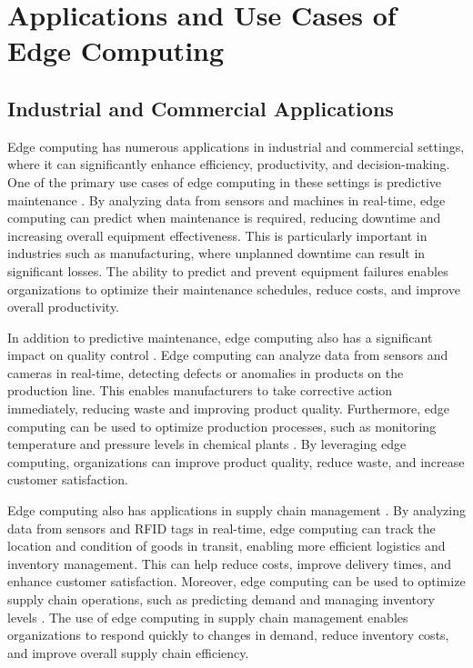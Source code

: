 \documentclass[11pt]{article}
\begin{document}
\section{Applications and Use Cases of Edge Computing}

\subsection{Industrial and Commercial Applications}

Edge computing has numerous applications in industrial and commercial settings, where it can significantly enhance efficiency, productivity, and decision-making. One of the primary use cases of edge computing in these settings is predictive maintenance \cite{ref45}. By analyzing data from sensors and machines in real-time, edge computing can predict when maintenance is required, reducing downtime and increasing overall equipment effectiveness. This is particularly important in industries such as manufacturing, where unplanned downtime can result in significant losses. The ability to predict and prevent equipment failures enables organizations to optimize their maintenance schedules, reduce costs, and improve overall productivity.

In addition to predictive maintenance, edge computing also has a significant impact on quality control \cite{ref46}. Edge computing can analyze data from sensors and cameras in real-time, detecting defects or anomalies in products on the production line. This enables manufacturers to take corrective action immediately, reducing waste and improving product quality. Furthermore, edge computing can be used to optimize production processes, such as monitoring temperature and pressure levels in chemical plants \cite{ref47}. By leveraging edge computing, organizations can improve product quality, reduce waste, and increase customer satisfaction.

Edge computing also has applications in supply chain management \cite{ref48}. By analyzing data from sensors and RFID tags in real-time, edge computing can track the location and condition of goods in transit, enabling more efficient logistics and inventory management. This can help reduce costs, improve delivery times, and enhance customer satisfaction. Moreover, edge computing can be used to optimize supply chain operations, such as predicting demand and managing inventory levels \cite{ref49}. The use of edge computing in supply chain management enables organizations to respond quickly to changes in demand, reduce inventory costs, and improve overall supply chain efficiency.
\end{document}
